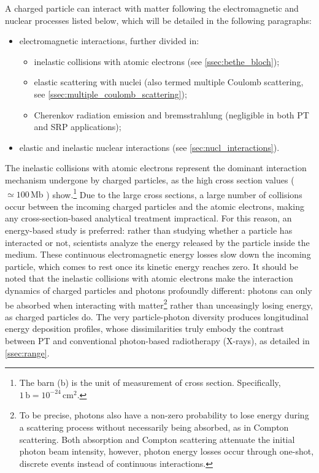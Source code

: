 A charged particle can interact with matter following the electromagnetic and nuclear processes listed below, which will be detailed in the following paragraphs:
\begin{itemize}
	\item electromagnetic interactions, further divided in:
	\begin{itemize}
		\item inelastic collisions with atomic electrons (see \autoref{ssec:bethe_bloch});
		\item elastic scattering with nuclei (also termed multiple Coulomb scattering, see \autoref{ssec:multiple_coulomb_scattering});
		\item Cherenkov radiation emission and bremsstrahlung (negligible in both PT and SRP applications);
	\end{itemize}
	\item elastic and inelastic nuclear interactions (see \autoref{sec:nucl_interactions}).
\end{itemize}
The inelastic collisions with atomic electrons represent the dominant interaction mechanism undergone by charged particles, as the high cross section values ($\simeq100\,\mathrm{Mb}$ \cite{slide_spighi}) show.\footnote{The barn (b) is the unit of measurement of cross section. Specifically, $1\,\mathrm{b}=10^{-24}\,\mathrm{cm}^{2}$.} Due to the large cross sections, a large number of collisions occur between the incoming charged particles and the atomic electrons, making any cross-section-based analytical treatment impractical. For this reason, an energy-based study is preferred: rather than studying whether a particle has interacted or not, scientists analyze the energy released by the particle inside the medium. These continuous electromagnetic energy losses slow down the incoming particle, which comes to rest once its kinetic energy reaches zero. It should be noted that the inelastic collisions with atomic electrons make the interaction dynamics of charged particles and photons profoundly different: photons can only be absorbed when interacting with matter\footnote{To be precise, photons also have a non-zero probability to lose energy during a scattering process without necessarily being absorbed, as in Compton scattering. Both absorption and Compton scattering attenuate the initial photon beam intensity, however, photon energy losses occur through one-shot, discrete events instead of continuous interactions.} rather than unceasingly losing energy, as charged particles do. The very particle-photon diversity produces longitudinal energy deposition profiles, whose dissimilarities truly embody the contrast between PT and conventional photon-based radiotherapy (X-rays), as detailed in \autoref{ssec:range}.


